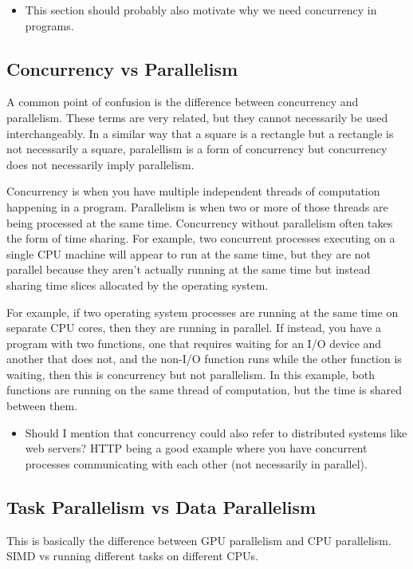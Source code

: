 \documentclass{article}
\begin{document}
\begin{itemize}
  \item This section should probably also motivate why we need concurrency in
        programs.
\end{itemize}

\subsection{Concurrency vs Parallelism}
A common point of confusion is the difference between concurrency and parallelism.
These terms are very related, but they cannot necessarily be used interchangeably.
In a similar way that a square is a rectangle but a rectangle is not necessarily a
square, paralellism is a form of concurrency but concurrency does not necessarily
imply parallelism.

Concurrency is when you have multiple independent threads of computation happening
in a program. Parallelism is when two or more of those threads are being processed
at the same time. Concurrency without parallelism often takes the form of time sharing.
For example, two concurrent processes executing on a single CPU machine will appear
to run at the same time, but they are not parallel because they aren't actually running
at the same time but instead sharing time slices allocated by the operating system.

For example, if two operating system processes are running at the same time on
separate CPU cores, then they are running in parallel. If instead, you have a
program with two functions, one that requires waiting for an I/O device and another
that does not, and the non-I/O function runs while the other function is waiting,
then this is concurrency but not parallelism. In this example, both functions are
running on the same thread of computation, but the time is shared between them.

\begin{itemize}
  \item Should I mention that concurrency could also refer to distributed
        systems like web servers? HTTP being a good example where you have
        concurrent processes communicating with each other (not necessarily in
        parallel).
\end{itemize}

\subsection{Task Parallelism vs Data Parallelism}
This is basically the difference between GPU parallelism
and CPU parallelism. SIMD vs running different tasks on
different CPUs.
\end{document}

